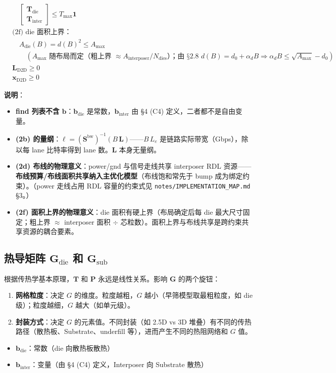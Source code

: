 \documentclass[11pt]{article}
\newcommand{\bv}{\mathbf}
\begin{document}
\begin{equation}
{\begin{aligned}
&\quad \begin{bmatrix}\bv{T}_{\text{die}} \\ \bv{T}_{\text{inter}}\end{bmatrix} \le T_{\max}\bv{1} \\
& \text{(2f) die 面积上界：}\\
&\quad A_{\text{die}}(B) = d(B)^2 \le A_{\max} \\
&\qquad \left(A_{\max} \text{ 随布局而定（粗上界 } \approx A_{\text{interposer}}/N_{\text{dies}}\text{）；由 §2.8 } d(B) = d_0 + \alpha_d B \Rightarrow \alpha_d B \le \sqrt{A_{\max}} - d_0\right) \\
& \bv{L}_{\text{D2D}} \ge 0 \\
& \bv{x}_{\text{D2D}} \ge 0
\end{aligned}
}
\end{equation}

\textbf{说明}：
\begin{itemize}
\item \textbf{find 列表不含 $\bv{b}$}：$\bv{b}_{\text{die}}$ 是常数，$\bv{b}_{\text{inter}}$ 由 §4 (C4) 定义，二者都不是自由变量。
\item \textbf{(2b) 的量纲}：$\boldsymbol{\ell} = \left(\bv{S}^{\text{bw}}\right)^{-1}(B\,\bv{L})$——$B\,L_e$ 是链路实际带宽（Gbps），除以每 lane 比特率得到 lane 数。$\bv{L}$ 本身无量纲。
\item \textbf{(2d) 布线的物理意义}：power/gnd 与信号走线共享 interposer RDL 资源——\textbf{布线预算/布线面积共享纳入主优化模型}（布线饱和常先于 bump 成为绑定约束）。（power 走线占用 RDL 容量的约束式见 \texttt{notes/IMPLEMENTATION\_MAP.md} §3。）
\item \textbf{(2f) 面积上界的物理意义}：die 面积有硬上界（布局确定后每 die 最大尺寸固定；粗上界 $\approx$ interposer 面积 $\div$ 芯粒数）。面积上界与布线共享是跨约束共享资源的耦合要素。
\end{itemize}

\subsection{热导矩阵 $\bv{G}_{\text{die}}$ 和 $\bv{G}_{\text{sub}}$}

根据传热学基本原理，$\bv{T}$ 和 $\bv{P}$ 永远是线性关系。影响 $\bv{G}$ 的两个旋钮：
\begin{enumerate}
\item \textbf{网格粒度}：决定 $G$ 的维度。粒度越粗，$G$ 越小（早筛模型取最粗粒度，如 die 级）；粒度越细，$G$ 越大（如单元级）。
\item \textbf{封装方式}：决定 $G$ 的元素值。不同封装（如 2.5D vs 3D 堆叠）有不同的传热路径（散热板、Substrate、underfill 等），进而产生不同的热阻网络和 $G$ 值。
\end{enumerate}
\begin{itemize}
\item $\bv{b}_{\text{die}}$：常数（die 向散热板散热）
\item $\bv{b}_{\text{inter}}$：变量（由 §4 (C4) 定义，Interposer 向 Substrate 散热）
\end{itemize}
\end{document}
